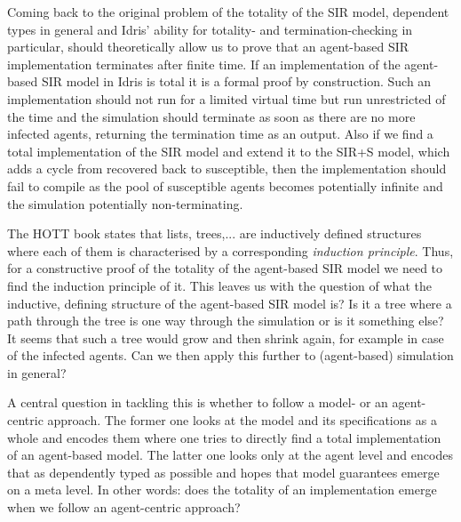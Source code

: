 Coming back to the original problem of the totality of the SIR model, dependent types in general and Idris' ability for totality- and termination-checking in particular, should theoretically allow us to prove that an agent-based SIR implementation terminates after finite time. If an implementation of the agent-based SIR model in Idris is total it is a formal proof by construction. Such an implementation should not run for a limited virtual time but run unrestricted of the time and the simulation should terminate as soon as there are no more infected agents, returning the termination time as an output. Also if we find a total implementation of the SIR model and extend it to the SIR+S model, which adds a cycle from recovered back to susceptible, then the implementation should fail to compile as the pool of susceptible agents becomes potentially infinite and the simulation potentially non-terminating.

The HOTT book \cite{program_homotopy_2013} states that lists, trees,... are inductively defined structures where each of them is characterised by a corresponding \textit{induction principle}. Thus, for a constructive proof of the totality of the agent-based SIR model we need to find the induction principle of it. This leaves us with the question of what the inductive, defining structure of the agent-based SIR model is? Is it a tree where a path through the tree is one way through the simulation or is it something else? It seems that such a tree would grow and then shrink again, for example in case of the infected agents. Can we then apply this further to (agent-based) simulation in general?

A central question in tackling this is whether to follow a model- or an agent-centric approach. The former one looks at the model and its specifications as a whole and encodes them where one tries to directly find a total implementation of an agent-based model. The latter one looks only at the agent level and encodes that as dependently typed as possible and hopes that model guarantees emerge on a meta level. In other words: does the totality of an implementation emerge when we follow an agent-centric approach? 



